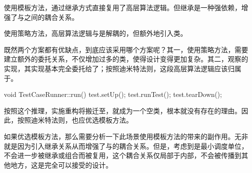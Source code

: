 \begin{content}
使用模板方法，通过继承方式直接复用了高层算法逻辑。但继承是一种强依赖，增强了与之间的耦合关系。

使用策略方法，高层算法逻辑与是解耦的，但额外地引入类。

既然两个方案都有优缺点，到底应该采用哪个方案呢？其一，使用策略方法，需要建立额外的委托关系，不仅增加过多的类，使得设计变得更加复杂。其二，观察的实现，其实现基本完全委托给了；按照迪米特法则，这段高层算法逻辑应该归属于。

\begin{leftbar}
\begin{c++}
void TestCaseRunner::run() {
  test.setUp();
  test.runTest();
  test.tearDown();
}
\end{c++}
\end{leftbar}

按照这个推理，实施重构将搬迁至，就成为一个空类，根本就没有存在的理由。因此，按照迪米特法则，也应优选模板方法。

如果优选模板方法，那么需要分析一下此场景使用模板方法的带来的副作用。无非就是因为引入继承关系从而增强了与的耦合关系。但是，考虑到是最小调度单位，不会进一步被继承或组合而被复用，这个耦合关系仅局部于内部，不会被传播到其他地方，这是完全可以接受的设计。



\end{content}
